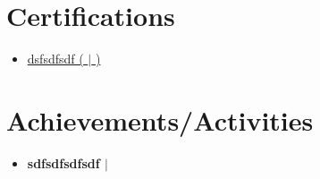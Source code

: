 \documentclass[letterpaper,5pt]{article}
\begin{document}
    
    
        \section{Certifications}
          \begin{itemize}[leftmargin=0.45in,label={}]
          
              \item[\textbullet{}]\href{}{dsfsdfsdf (\emph{ $|$ })} \faExternalLink
              \newline 
              \vspace{-20pt}
          \vspace{8pt}
          \end{itemize}
      
    
    
          \section{Achievements/Activities}
          \begin{itemize}[leftmargin=0.15in, label={}]
          \item[]
          
            \textbf{sdfsdfsdfsdf $|$ \emph{} } \hfill{}

                \hspace{0.15in}
                \textbullet{}  
                \newline

                \vspace{-10pt} 
                
                
            \end{itemize}
          
      
\end{document}
